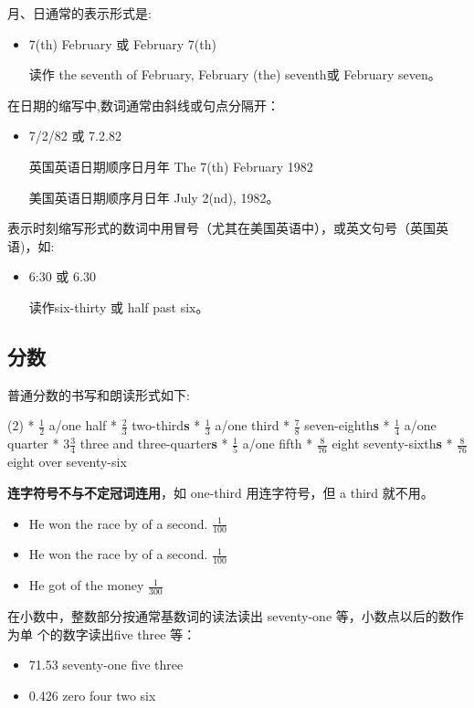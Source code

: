 月、日通常的表示形式是:
\begin{itemize}
\item 7(th) February 或 February 7(th)

  读作 the seventh of February, February (the) seventh或 February seven。
\end{itemize}

在日期的缩写中,数词通常由斜线或句点分隔开：
\begin{itemize}
\item 7/2/82 或 7.2.82

  英国英语日期顺序日月年 The 7(th) February 1982

  美国英语日期顺序月日年 July 2(nd), 1982。
\end{itemize}

表示时刻缩写形式的数词中用冒号（尤其在美国英语中），或英文句号（英国英语)，如:
\begin{itemize}
\item 6:30 或 6.30

  读作six-thirty 或 half past six。
\end{itemize}

\subsection{分数}

 普通分数的书写和朗读形式如下:
 \begin{taskitem}(2)
   * $\frac{1}{2}$ a/one half
   * $\frac{2}{3}$ two-third\textbf{s}
   * $\frac{1}{3}$ a/one third
   * $\frac{7}{8}$ seven-eighth\textbf{s}
   * $\frac{1}{4}$ a/one quarter
   * $3\frac{3}{4}$ three and three-quarter\textbf{s}
   * $\frac{1}{5}$ a/one fifth
   * $\frac{8}{76}$ eight seventy-sixth\textbf{s}
   * $\frac{8}{76}$ eight over seventy-six
 \end{taskitem}

\textbf{连字符号不与不定冠词连用}，如 one-third 用连字符号，但 a third 就不用。

\begin{itemize}
\item He won the race by  of a second. $\frac{1}{100}$
\item He won the race by  of a second. $\frac{1}{100}$
\item He got  of the money $\frac{1}{300}$
\end{itemize}

在小数中，整数部分按通常基数词的读法读出 seventy-one 等，小数点以后的数作为单
个的数字读出five three 等：
 \begin{itemize}
 \item 71.53 seventy-one  five three

 \item 0.426  zero  four two six
 \end{itemize}

